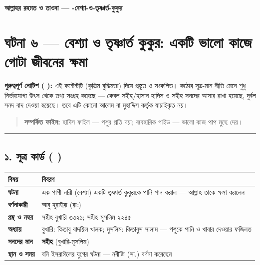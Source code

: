 

\begin{center}{\Large\bfseries\color{emerald} আল্লাহর রহমত ও তাওবা — -বেশ্যা-ও-তৃষ্ণার্ত-কুকুর}\end{center}
\vspace{1em}
\section*{ঘটনা ৬ — বেশ্যা ও তৃষ্ণার্ত কুকুর: একটি ভালো কাজে গোটা জীবনের ক্ষমা}

\begin{warnbox}
 \textbf{গুরুত্বপূর্ণ নোটিশ ( ):} এই কন্টেন্টটি  (কৃত্রিম বুদ্ধিমত্তা) দিয়ে প্রস্তুত ও সংকলিত।  কঠোর সূত্র-মান নীতি মেনে শুধু নির্ভরযোগ্য উৎস থেকে তথ্য সংগ্রহ করেছে — কেবল সহীহ/হাসান হাদিস ও সহীহ সনদের আসার রাখা হয়েছে, দুর্বল সনদ বাদ দেওয়া হয়েছে। তবে এটি কোনো আলেম বা মুহাদ্দিস কর্তৃক যাচাইকৃত নয়।
\end{warnbox}

\begin{quote}
\textbf{সম্পর্কিত ফাইল:} হাদিস ফাইল — পশুর প্রতি দয়া; ব্যবহারিক গাইড — ভালো কাজ পাপ মুছে দেয়।
\end{quote}

\medskip\hrule\medskip

\subsection*{১. সূত্র কার্ড ( )}

\begin{table}[h]\centering\small
\begin{tabular}{ll}
বিষয় & বিবরণ \\
\hline
\textbf{ঘটনা} & এক পাপী নারী (বেশ্যা) একটি তৃষ্ণার্ত কুকুরকে পানি পান করাল — আল্লাহ তাকে ক্ষমা করলেন \\
\textbf{বর্ণনাকারী} & আবু হুরাইরা (রাঃ) \\
\textbf{গ্রন্থ ও নম্বর} & সহীহ বুখারি ৩৩২১; সহীহ মুসলিম ২২৪৫ \\
\textbf{অধ্যায়} & বুখারি: কিতাবু বাদয়িল খালক; মুসলিম: কিতাবুস সালাম — \lat{“}পশুকে পানি ও খাবার দেওয়ার ফজিলত\lat{”} \\
\textbf{সনদের মান} & \textbf{সহীহ} (বুখারি-মুসলিম) \\
\textbf{স্থান ও সময়} & বনি ইসরাঈলের যুগের ঘটনা — নবীজি (সা.) বর্ণনা করেছেন \\
\hline
\end{tabular}
\end{table}

